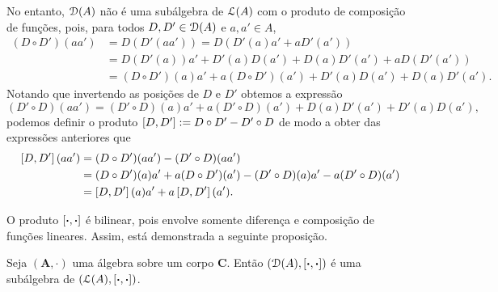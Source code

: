 No entanto, $\mathcal{D}(A)$ não é uma subálgebra de $\mathcal{L}(A)$ com o produto de composição de funções, pois, para todos $D,D' \in \mathcal{D}(A)$ e $a,a' \in A$,
	\begin{align*}
	(D \circ D')(aa') &= D(D'(aa')) = D(D'(a)a' + aD'(a')) \\
		&= D(D'(a))a' + D'(a)D(a') + D(a)D'(a') + a D(D'(a')) \\
		&= (D \circ D')(a)a' + a (D \circ D')(a') + D'(a)D(a') + D(a)D'(a').
	\end{align*}
Notando que invertendo as posições de $D$ e $D'$ obtemos a expressão
	\begin{equation*}
	(D' \circ D)(aa') = (D' \circ D)(a)a' + a (D' \circ D)(a') + D(a)D'(a') + D'(a)D(a'),
	\end{equation*}
podemos definir o produto $\left[{D},{D'}\right] := D \circ D' - D' \circ D$ de modo a obter das expressões anteriores que
	\begin{align*}
	\left[{D},{D'}\right](aa') &= (D \circ D')(aa') - (D' \circ D)(aa') \\
		&= (D \circ D')(a)a' + a (D \circ D')(a') - (D' \circ D)(a)a' - a (D' \circ D)(a') \\
		&= \left[{D},{D'}\right](a)a' + a\left[{D},{D'}\right](a').
	\end{align*}

O produto $\left[{\bm{\cdot}},{\bm{\cdot}}\right]$ é bilinear, pois envolve somente diferença e composição de funções lineares. Assim, está demonstrada a seguinte proposição.

\begin{proposition}
\label{alge:prop.algebra.colchete.deriv}
Seja $(\bm A,\cdot)$ uma álgebra sobre um corpo $\bm C$. Então $(\mathcal{D}(A),\left[{\bm{\cdot}},{\bm{\cdot}}\right])$ é uma subálgebra de $(\mathcal{L}(A),\left[{\bm{\cdot}},{\bm{\cdot}}\right])$.
\end{proposition}
















